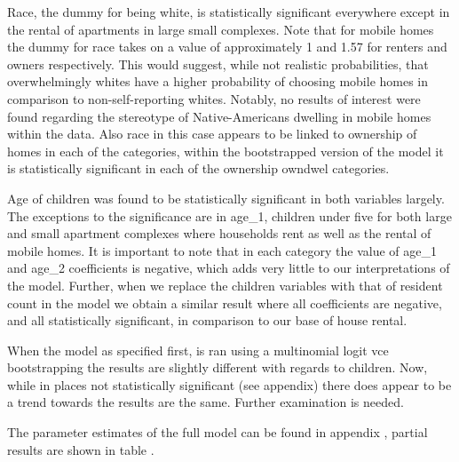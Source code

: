\documentclass{article}
\begin{document}
Race, the dummy for being white, is statistically significant everywhere except in the rental of apartments in large small complexes.  Note that for mobile homes the dummy for race takes on a value of approximately 1 and 1.57 for renters and owners respectively.  This would suggest, while not realistic probabilities, that overwhelmingly whites have a higher probability of choosing mobile homes in comparison to non-self-reporting whites.  Notably, no results of interest were found regarding the stereotype of Native-Americans dwelling in mobile homes within the data.  Also race in this case appears to be linked to ownership of homes in each of the categories, within the bootstrapped version of the model it is statistically significant in each of the ownership owndwel categories.  

Age of children was found to be statistically significant in both variables largely.  The exceptions to the significance are in age_1, children under five for both large and small apartment complexes where households rent as well as the rental of mobile homes.  It is important to note that in each category the value of age_1 and age_2 coefficients is negative, which adds very little to our interpretations of the model.  Further, when we replace the children variables with that of resident count in the model we obtain a similar result where all coefficients are negative, and all statistically significant, in comparison to our base of house rental. 

When the model as specified first, is ran using a multinomial logit vce bootstrapping the results are slightly different with regards to children.  Now, while in places not statistically significant (see appendix) there does appear to be a trend towards the results are the same.  Further examination is needed.

The parameter estimates of the full model can be found in appendix 
, partial results are shown in table 
.
  
\end{document}
